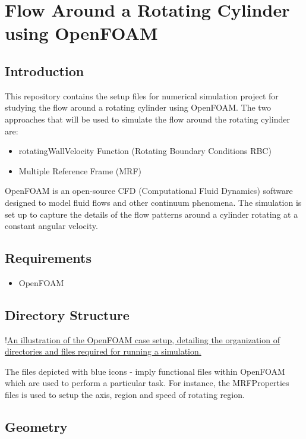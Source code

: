 \section{Flow Around a Rotating Cylinder using OpenFOAM}

\subsection{Introduction}

This repository contains the setup files for numerical simulation project for studying the flow around a rotating cylinder using OpenFOAM. The two approaches that will be used to simulate the flow around the rotating cylinder are: 

\begin{itemize}
\item rotatingWallVelocity Function (Rotating Boundary Conditions {RBC})
\item Multiple Reference Frame (MRF)
\end{itemize}

OpenFOAM is an open-source CFD (Computational Fluid Dynamics) software designed to model fluid flows and other continuum phenomena. The simulation is set up to capture the details of the flow patterns around a cylinder rotating at a constant angular velocity.

\subsection{Requirements}

\begin{itemize}
\item OpenFOAM 
\end{itemize}

\subsection{Directory Structure}

!\href{Images/Directory.png}{An illustration of the OpenFOAM case setup, detailing the organization of directories and files required for running a simulation.}

The files depicted with blue icons - imply functional files within OpenFOAM which are used to perform a particular task. For instance, the MRFProperties files is used to setup the axis, region and speed of rotating region.

\subsection{Geometry}


